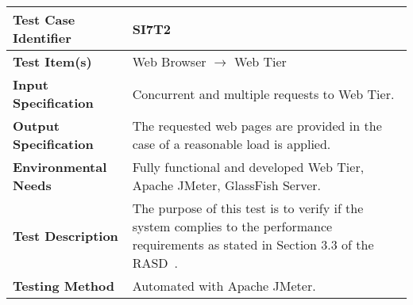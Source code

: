 \begin{longtable}{p{} | p{}}
\hline
\textbf{Test Case Identifier} & SI7T2\\
\hline
\textbf{Test Item(s)} & Web Browser $\rightarrow$ Web Tier \\
\hline
\textbf{Input Specification} & Concurrent and multiple requests to Web Tier. \\
\hline
\textbf{Output Specification} & The requested web pages are provided in the case of a reasonable load is applied. \\
\hline
\textbf{Environmental Needs} & Fully functional and developed Web Tier, Apache JMeter, GlassFish Server. \\
\hline
\textbf{Test Description} & The purpose of this test is to verify if the system complies to the performance requirements as stated in Section 3.3 of the RASD~\cite{rasd}. \\
\hline
\textbf{Testing Method} & Automated with Apache JMeter. \\
\hline
\end{longtable}